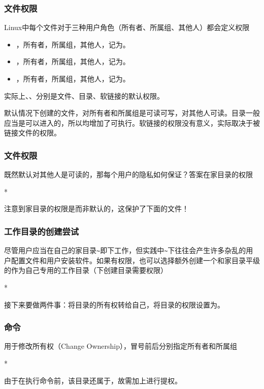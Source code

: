 \begin{frame}
    \frametitle{文件权限}
    Linux中每个文件对于三种用户角色（所有者、所属组、其他人）都会定义权限
    \begin{itemize}
        \item {}，所有者，所属组，其他人，记为。
        \item {}，所有者，所属组，其他人，记为。
        \item {}，所有者，所属组，其他人，记为。
    \end{itemize}
    实际上、、分别是文件、目录、软链接的默认权限。
    
    默认情况下创建的文件，对所有者和所属组是可读可写，对其他人可读。目录一般应当是可以进入的，所以均增加了可执行。软链接的权限没有意义，实际取决于被链接文件的权限。
\end{frame}

\begin{frame}
    \frametitle{文件权限}
    既然默认对其他人是可读的，那每个用户的隐私如何保证？答案在家目录的权限
    \begin{Code}*
        
    \end{Code}
    注意到家目录的权限是而非默认的，这保护了下面的文件！
\end{frame}

\begin{frame}
    \frametitle{工作目录的创建尝试}
    尽管用户应当在自己的家目录\texttt{\textasciitilde{}}即下工作，但实践中\texttt{\textasciitilde{}}下往往会产生许多杂乱的用户配置文件和用户安装软件。如果有权限，也可以选择额外创建一个和家目录平级的作为自己专用的工作目录（下创建目录需要权限）
    \begin{Code}*
        
    \end{Code}
    接下来要做两件事：将目录的所有权转给自己，将目录的权限设置为。
\end{frame}

\begin{frame}
    \frametitle{命令}
    用于修改所有权（Change Ownership），冒号前后分别指定所有者和所属组
    \begin{Code}*
        
    \end{Code}
    由于在执行命令前，该目录还属于，故需加上进行提权。
\end{frame}

